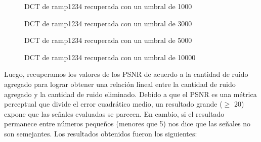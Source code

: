 \documentclass[10pt, a4paper]{article}
\begin{document}
\begin{itemize}
\begin{itemize}
\begin{figure}[H] %
\hfill
\begin{minipage}[t]{.45\textwidth}
\begin{center}
\caption{DCT de ramp1234 recuperada con un umbral de 1000}
\label{fig-tc1}
\end{center}
\end{minipage}
\hfill
\begin{minipage}[t]{.45\textwidth}
\begin{center}
\caption{DCT de ramp1234 recuperada con un umbral de 3000}
\label{fig-tc2}
\end{center}
\end{minipage}
\hfill
\end{figure} 

\begin{figure}[H] %
\hfill
\begin{minipage}[t]{.45\textwidth}
\begin{center}
\caption{DCT de ramp1234 recuperada con un umbral de 5000}
\label{fig-tc1}
\end{center}
\end{minipage}
\hfill
\begin{minipage}[t]{.45\textwidth}
\begin{center}
\caption{DCT de ramp1234 recuperada con un umbral de 10000}
\label{fig-tc2}
\end{center}
\end{minipage}
\hfill
\end{figure} 
\end{itemize}

Luego, recuperamos los valores de los PSNR de acuerdo a la cantidad de ruido agregado para lograr obtener una relación lineal entre la cantidad de ruido agregado y la cantidad de ruido eliminado. Debido a que el PSNR es una métrica perceptual que divide el error cuadrático medio, un resultado grande ($\geq$ 20) expone que las señales evaluadas se parecen. En cambio, si el resultado permanece entre números pequeños (menores que 5) nos dice que las señales no son semejantes. Los resultados obtenidos fueron los siguientes:\newline
 

\end{itemize}
\end{document}
